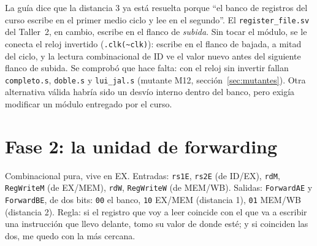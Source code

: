 \documentclass[11pt,letterpaper]{article}
\newcommand{\cod}[1]{\texttt{#1}}
\begin{document}
\begin{supuesto}
La gu\'ia dice que la distancia 3 ya est\'a resuelta porque ``el banco de registros del curso escribe en
el primer medio ciclo y lee en el segundo''. El \cod{register\_file.sv} del Taller~2, en cambio,
escribe en el flanco de \emph{subida}. Sin tocar el m\'odulo, se le conecta el reloj invertido
(\cod{.clk(\textasciitilde clk)}): escribe en el flanco de bajada, a mitad del ciclo, y la lectura
combinacional de ID ve el valor nuevo antes del siguiente flanco de subida. Se comprob\'o que hace
falta: con el reloj sin invertir fallan \cod{completo.s}, \cod{doble.s} y \cod{lui\_jal.s}
(mutante M12, secci\'on~\ref{sec:mutantes}). Otra alternativa v\'alida habr\'ia sido un desv\'io interno
dentro del banco, pero exig\'ia modificar un m\'odulo entregado por el curso.
\end{supuesto}

\section{Fase 2: la unidad de forwarding}
\begin{enunciado}
Combinacional pura, vive en EX. Entradas: \cod{rs1E}, \cod{rs2E} (de ID/EX), \cod{rdM}, \cod{RegWriteM}
(de EX/MEM), \cod{rdW}, \cod{RegWriteW} (de MEM/WB). Salidas: \cod{ForwardAE} y \cod{ForwardBE}, de dos
bits: \cod{00} el banco, \cod{10} EX/MEM (distancia 1), \cod{01} MEM/WB (distancia 2). Regla: si el
registro que voy a leer coincide con el que va a escribir una instrucci\'on que llevo delante, tomo su
valor de donde est\'e; y si coinciden las dos, me quedo con la m\'as cercana.
\end{enunciado}
\end{document}
